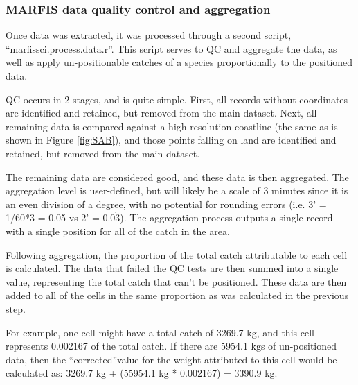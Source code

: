 \documentclass[letterpaper,portrait,11pt]{scrartcl}
\numberwithin{equation}{section}		%
\numberwithin{figure}{section}		%
\numberwithin{table}{section}				%
\begin{document}


\subsubsection{MARFIS data quality control and aggregation}
Once data was extracted, it was processed through a second script, \textquotedblleft marfissci.process.data.r\textquotedblright.  This script serves to QC and aggregate the data, as well as apply un-positionable catches of a species proportionally to the positioned data.

QC occurs in 2 stages, and is quite simple.  First, all records without coordinates are identified and retained, but removed from the main dataset.  Next, all remaining data is compared against a high resolution coastline (the same as is shown in Figure \ref{fig:SAB}), and those points falling on land are identified and retained, but removed from the main dataset.

The remaining data are considered good, and these data is then aggregated.  The aggregation level is user-defined, but will likely be a scale of 3 minutes since it is an even division of a degree, with no potential for rounding errors (i.e. 3' = 1/60*3 = 0.05 vs 2' = $0.0\dot{3}$).  The aggregation process outputs a single record with a single position for all of the catch in the area.

Following aggregation, the proportion of the total catch attributable to each cell is calculated.  The data that failed the QC tests are then summed into a single value, representing the total catch that can\textquoteright t be positioned.  These data are then added to all of the cells in the same proportion as was calculated in the previous step.

For example, one cell might have a total catch of 3269.7 kg, and this cell represents 0.002167 of the total catch.  If there are 5954.1 kgs of un-positioned data, then the \textquotedblleft corrected\textquotedblright value for the weight attributed to this cell would be calculated as:
3269.7 kg + (55954.1 kg * 0.002167) = 3390.9 kg.
\end{document}
